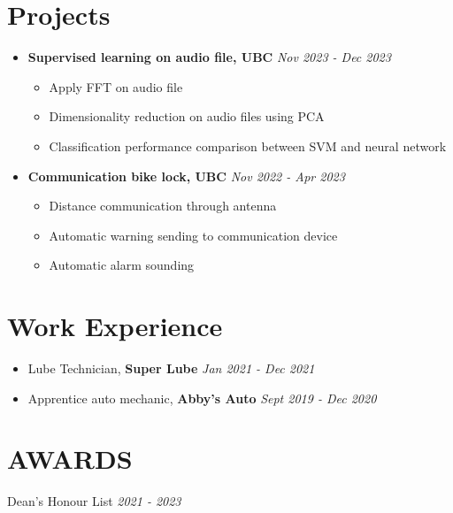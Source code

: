 \documentclass[12pt]{article}
\begin{document}
\section{Projects}
\begin{itemize}
    \itemsep=-0em
    \item \textbf{Supervised learning on audio file, UBC} \hfill \textit{Nov 2023 - Dec 2023} \begin{itemize}
        \item Apply FFT on audio file
        \item Dimensionality reduction on audio files using PCA
        \item Classification performance comparison between SVM and neural network
    \end{itemize}
    \item \textbf{Communication bike lock, UBC} \hfill \textit{Nov 2022 - Apr 2023}
    \begin{itemize}
        \item Distance communication through antenna
        \item Automatic warning sending to communication device
        \item Automatic alarm sounding
        \end{itemize}
\end{itemize}

\section{Work Experience}
\begin{itemize}
    \item Lube Technician, \textbf{Super Lube} \hfill \textit{Jan 2021 - Dec 2021}
    \item Apprentice auto mechanic, \textbf{Abby's Auto} \hfill \textit{Sept 2019 - Dec 2020}
\end{itemize}

\section{AWARDS}
Dean's Honour List \hfill \textit{2021 - 2023} \\
\end{document}
